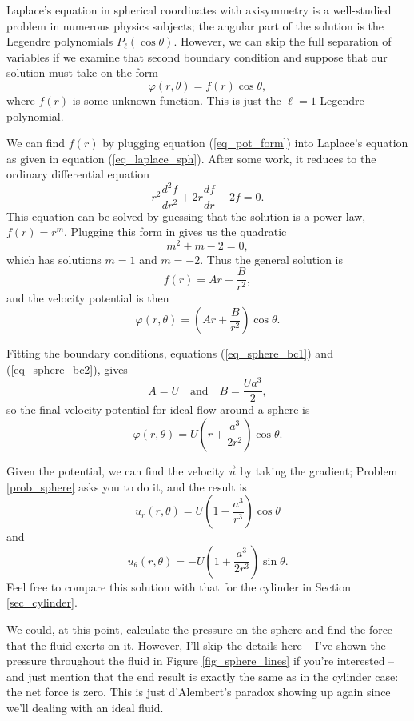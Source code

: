Laplace's equation in spherical coordinates with axisymmetry is a well-studied problem in numerous physics subjects; the angular part of the solution is the Legendre polynomials $P_\ell (\cos\theta)$.  However, we can skip the full separation of variables if we examine that second boundary condition and suppose that our solution must take on the form
\begin{equation}
\label{eq_pot_form}
\varphi(r, \theta) = f(r) \cos \theta,
\end{equation}
where $f(r)$ is some unknown function.  This is just the $\ell = 1$ Legendre polynomial.  

We can find $f(r)$ by plugging equation (\ref{eq_pot_form}) into Laplace's equation as given in equation (\ref{eq_laplace_sph}).  After some work, it reduces to the ordinary differential equation
\begin{equation}
r^2 \frac{d^2f}{dr^2} + 2r \frac{df}{dr} - 2f = 0.
\end{equation}
This equation can be solved by guessing that the solution is a power-law, $f(r) = r^m$.  Plugging this form in gives us the quadratic
\[
m^2 + m - 2 = 0,
\]
which has solutions $m = 1$ and $m = -2$.  Thus the general solution is
\[
f(r) = Ar + \frac{B}{r^2},
\]
and the velocity potential is then
\[
\varphi(r, \theta) = \left(Ar + \frac{B}{r^2} \right) \cos \theta.
\]

Fitting the boundary conditions, equations (\ref{eq_sphere_bc1}) and (\ref{eq_sphere_bc2}), gives
\[
A = U \quad \text{and} \quad B = \frac{Ua^3}{2},
\]
so the final velocity potential for ideal flow around a sphere is
\begin{equation}
\label{eq_sphere_pot}
\varphi(r, \theta) = U \left( r + \frac{a^3}{2r^2} \right) \cos \theta.
\end{equation}

Given the potential, we can find the velocity $\vec{u}$ by taking the gradient; Problem \ref{prob_sphere} asks you to do it, and the result is
\begin{equation}
u_r(r, \theta) = U \left( 1 - \frac{a^3}{r^3} \right) \cos \theta
\end{equation}
and
\begin{equation}
u_\theta(r, \theta) = -U \left( 1 + \frac{a^3}{2r^3} \right) \sin \theta.
\end{equation}
Feel free to compare this solution with that for the cylinder in Section \ref{sec_cylinder}.  

We could, at this point, calculate the pressure on the sphere and find the force that the fluid exerts on it.  However, I'll skip the details here -- I've shown the pressure throughout the fluid in Figure \ref{fig_sphere_lines} if you're interested -- and just mention that the end result is exactly the same as in the cylinder case:  the net force is zero.  This is just d'Alembert's paradox showing up again since we'll dealing with an ideal fluid.

